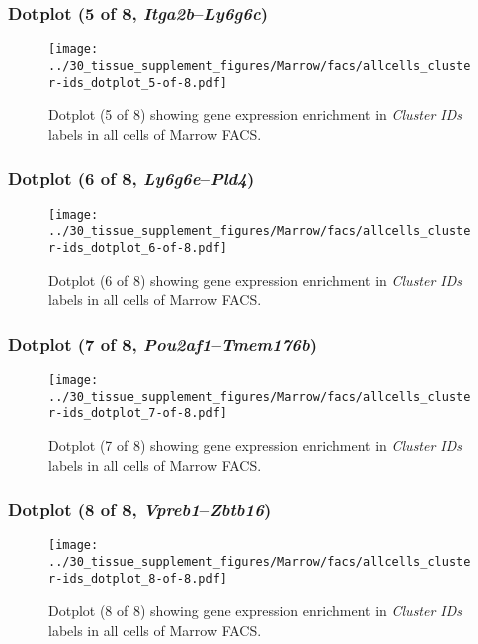 \clearpage

\subsubsection{Dotplot (5 of 8, \emph{Itga2b}--\emph{Ly6g6c})}
\begin{figure}[h]
\centering
\texttt{[image: ../30\_tissue\_supplement\_figures/Marrow/facs/allcells\_cluster-ids\_dotplot\_5-of-8.pdf]}

\caption{ Dotplot (5 of 8)  showing gene expression enrichment in \emph{Cluster IDs} labels in all cells of Marrow FACS. }
\end{figure}


\clearpage

\subsubsection{Dotplot (6 of 8, \emph{Ly6g6e}--\emph{Pld4})}
\begin{figure}[h]
\centering
\texttt{[image: ../30\_tissue\_supplement\_figures/Marrow/facs/allcells\_cluster-ids\_dotplot\_6-of-8.pdf]}

\caption{ Dotplot (6 of 8)  showing gene expression enrichment in \emph{Cluster IDs} labels in all cells of Marrow FACS. }
\end{figure}


\clearpage

\subsubsection{Dotplot (7 of 8, \emph{Pou2af1}--\emph{Tmem176b})}
\begin{figure}[h]
\centering
\texttt{[image: ../30\_tissue\_supplement\_figures/Marrow/facs/allcells\_cluster-ids\_dotplot\_7-of-8.pdf]}

\caption{ Dotplot (7 of 8)  showing gene expression enrichment in \emph{Cluster IDs} labels in all cells of Marrow FACS. }
\end{figure}


\clearpage

\subsubsection{Dotplot (8 of 8, \emph{Vpreb1}--\emph{Zbtb16})}
\begin{figure}[h]
\centering
\texttt{[image: ../30\_tissue\_supplement\_figures/Marrow/facs/allcells\_cluster-ids\_dotplot\_8-of-8.pdf]}

\caption{ Dotplot (8 of 8)  showing gene expression enrichment in \emph{Cluster IDs} labels in all cells of Marrow FACS. }
\end{figure}


